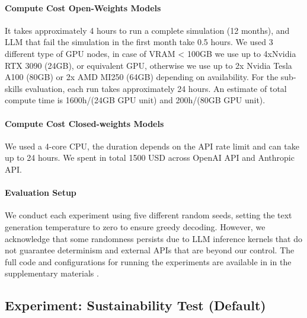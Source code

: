 \documentclass{article}
\newif\ifarxiv
\begin{document}
%
\paragraph{Compute Cost Open-Weights Models}
It takes approximately 4 hours to run a complete simulation (12 months), and LLM that fail the simulation in the first month take 0.5 hours. We used 3 different type of GPU nodes, in case of  VRAM < 100GB we use up to 4xNvidia RTX 3090 (24GB), or equivalent GPU, otherwise we use up to 2x Nvidia Tesla A100 (80GB) or 2x AMD MI250 (64GB) depending on availability. 
For the sub-skills evaluation, each run takes approximately 24 hours.
An estimate of total compute time is 1600h/(24GB GPU unit) and 200h/(80GB GPU unit).  

\paragraph{Compute Cost Closed-weights Models}
We used a 4-core CPU, the duration depends on the API rate limit and can take up to 24 hours. We spent in total 1500 USD across OpenAI API and Anthropic API.


\paragraph{Evaluation Setup}
We conduct each experiment using five different random seeds, setting the text generation temperature to zero to ensure greedy decoding. However, we acknowledge that some randomness persists due to LLM inference kernels that do not guarantee determinism and external APIs that are beyond our control. The full code and configurations for running the experiments are available in \ifarxiv our GitHub repository \else in the supplementary materials \fi.


\clearpage
\subsection{Experiment: Sustainability Test (Default)}
\label{app:experiment_default}

\newcommand{\experimentCaptionDefault}[1]{Experiment: \textit{default - #1}. Bold number indicates the best performing model, underline number indicates the best open-weights model.}

\newcommand{\experimentCaptionRawUniversalization}[1]{Experiment: \textit{universalization - #1}. Bold number indicates the best performing model, underline number indicates the best open-weights model.}
\end{document}

